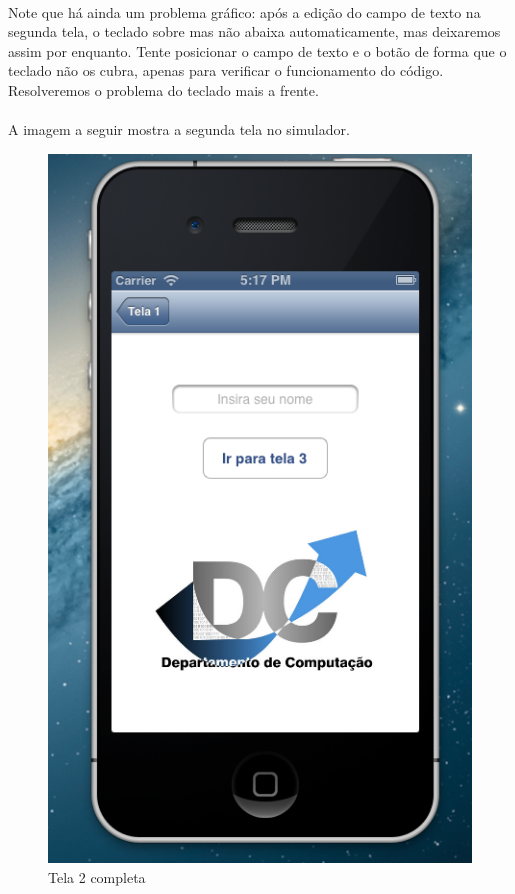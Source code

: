 \documentclass[a4paper,12pt,brazil,doubleside]{book}
\begin{document}
\begin{singlespace}
\paragraph{}Note que há ainda um problema gráfico: após a edição do campo de texto na segunda tela, o teclado sobre mas não abaixa automaticamente, mas deixaremos assim por enquanto. Tente posicionar o campo de texto e o botão de forma que o teclado não os cubra, apenas para verificar o funcionamento do código. Resolveremos o problema do teclado mais a frente.
\paragraph{}A imagem a seguir mostra a segunda tela no simulador.

\bigskip
\bigskip

\begin{figure}[H]
  \centering
  \includegraphics[totalheight=0.7\textheight]{figuras/2/simulador2_tela2.png}
  \caption{Tela 2 completa}
  \label{fig:a}
\end{figure}


\end{singlespace}
\end{document}
